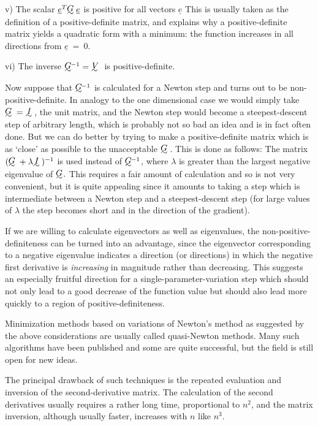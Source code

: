   v) The scalar ${\underline{e}}^T \UTG{\underline{e}}$ is positive for all vectors
${\underline{e}}$  This is usually
     taken as the definition of a positive-definite matrix, and explains
     why a positive-definite matrix yields a quadratic form with a
     minimum:  the function increases in all directions from ${\underline{e}}~=~0$.
 
 vi) The inverse $\UTG\!\!^{-1} = \UTV$ is positive-definite.
 
     Now suppose that $\UTG\!\!^{-1}$ is calculated for a Newton  step and turns out
to be non-positive-definite.  In analogy to the one dimensional case we
would simply take $\UTG = \UTI$, the unit matrix, and the Newton step would
become a steepest-descent step of arbitrary length, which is probably
not so bad an idea and is in fact often done.  But we can do better by
trying to make a positive-definite matrix which is as `close' as possible
to the unacceptable $\UTG$. This is done as follows:
 The matrix $(\UTG + \lambda \UTI)^{-1}$ is
used instead of $\UTG\!\!^{-1}$, where $\lambda$ is greater
     than the largest negative eigenvalue of $\UTG\!.$  This requires a fair
     amount of calculation and so is not very convenient, but it is
     quite appealing since it amounts to taking a step which is intermediate between a Newton step
and a steepest-descent step (for
     large values of  $\lambda$ the step becomes short and in the direction of
     the gradient).
 
 If we are willing to calculate eigenvectors as well as eigenvalues, the
     non-positive-definiteness can be turned into an advantage, since the eigenvector
corresponding to a negative eigenvalue
     indicates a direction (or directions) in which the negative first
     derivative is {\em increasing} in magnitude rather than decreasing.  This
     suggests an especially fruitful direction for a
single-parameter-variation step which should not only lead to a good
decrease of the
     function value but should also lead more quickly to a region of
     positive-definiteness.
 
     Minimization methods based on variations of Newton's method as
suggested by the above considerations are usually called quasi-Newton
methods.  Many such algorithms have been published and some are quite
successful, but the field is still open for new ideas.
 
     The principal drawback of such techniques is the repeated evaluation
 and inversion of the second-derivative matrix.  The calculation of
the second derivatives usually requires a rather long time, proportional
to $n^2$, and the matrix inversion, although usually faster, increases with
$n$ like $n^3$.
 
